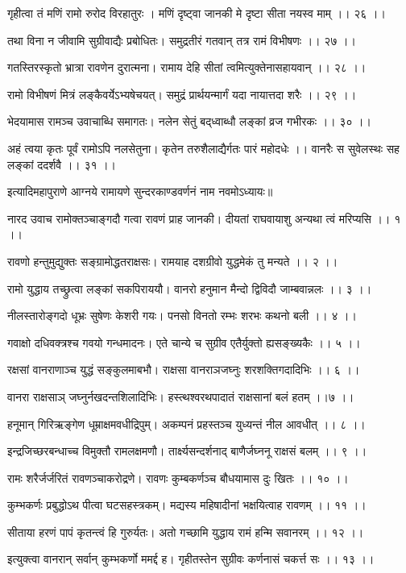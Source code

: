 गृहीत्वा तं मणिं रामो रुरोद विरहातुरः ।
मणिं दृष्ट्वा जानकी मे दृष्टा सीता नयस्व माम् ।। २६ ।।

तथा विना न जीवामि सुग्रीवाद्यैः प्रबोधितः।
समुद्रतीरं गतवान् तत्र रामं विभीषणः ।। २७ ।।

गतस्तिरस्कृतो भ्रात्रा रावणेन दुरात्मना।
रामाय देहि सीतां त्वमित्युक्तेनासहायवान् ।। २८ ।।

रामो विभीषणं मित्रं लङ्कैवर्येऽभ्यषेचयत्।
समुद्रं प्रार्थयन्मार्गं यदा नायात्तदा शरैः ।। २९ ।।

भेदयामास रामञ्च उवाचाब्धि समागतः।
नलेन सेतुं बद्‌ध्वाब्धौ लङ्कां व्रज गभीरकः ।। ३० ।।

अहं त्वया कृतः पूर्वं रामोऽपि नलसेतुना।
कृतेन तरुशैलाद्यैर्गतः पारं महोदधेः ।।
वानरैः स सुवेलस्थः सह लङ्कां ददर्शवै ।। ३१ ।।

इत्यादिमहापुराणे आग्नये रामायणे सुन्दरकाण्डवर्णनं नाम नवमोऽध्यायः॥

नारद उवाच
रामोक्तञ्चाङ्गदौ गत्वा रावणं प्राह जानकी।
दीयतां राघवायाशु अन्यथा त्वं मरिप्यसि ।। १ ।।

रावणो हन्तुमुद्युक्तः सङ्ग्रामोद्धतराक्षसः।
रामयाह दशग्रीवो युद्धमेकं तु मन्यते ।। २ ।।

रामो युद्धाय तच्छ्रुत्वा लङ्कां सकपिराययौ।
वानरो हनुमान मैन्दो द्विविदौ जाम्बवान्नलः ।। ३ ।।

नीलस्तारोङ्गदो धूभ्रः सुषेणः केशरी गयः।
पनसो विनतो रम्भः शरभः कथनो बली ।। ४ ।।

गवाक्षो दधिवक्त्रश्च गवयो गन्धमादनः।
एते चान्ये च सुग्रीव एतैर्युक्तो ह्यसङ्ख्यकैः ।। ५ ।।

रक्षसां वानराणाञ्च युद्धं सङ्कुलमाबभौ।
राक्षसा वानराञजघ्नुः शरशक्तिगदादिभिः ।। ६ ।।

वानरा राक्षसाञ् जघ्नुर्नखदन्तशिलादिभिः।
हस्त्थश्वरथपादातं राक्षसानां बलं हतम् ।।७ ।।

हनूमान् गिरिऋङ्गेण धूम्राक्षमवधीद्रिपुम्।
अकम्पनं प्रहस्तञ्च युध्यन्तं नील आवधीत् ।। ८ ।।

इन्द्रजिच्छरबन्धाच्च विमुक्तौ रामलक्षमणौ।
तार्क्ष्यसन्दर्शनाद् बाणैर्जघ्ननू राक्षसं बलम् ।। ९ ।।

रामः शरैर्जर्जरितं रावणञ्चाकरोद्रणे।
रावणः कुम्बकर्णञ्च बौधयामास दुः खितः ।। १० ।।

कुम्भकर्णः प्रबुद्धोऽथ पीत्वा घटसहस्त्रकम्।
मद्यस्य महिषादीनां भक्षयित्वाह रावणम् ।। ११ ।।

सीताया हरणं पापं कृतन्त्वं हि गुरुर्यतः।
अतो गच्छामि युद्धाय रामं हन्मि सवानरम् ।। १२ ।।

इत्युक्त्वा वानरान् सर्वान् कुम्भकर्णो ममर्द्द ह।
गृहीतस्तेन सुग्रीवः कर्णनासं चकर्त्त सः ।। १३ ।।

